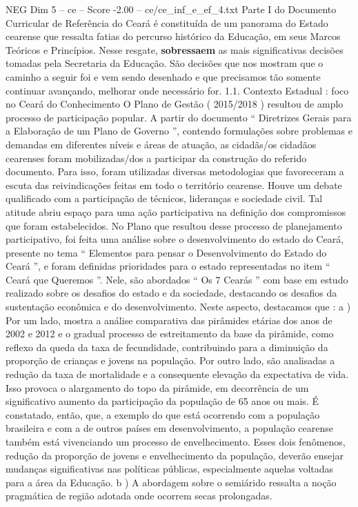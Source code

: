 \begin{textsample}{NEG Dim 5 – ce – Score -2.00 – ce/ce\_inf\_e\_ef\_4.txt}  \label{ex:f5_neg_036}
Parte I do Documento Curricular de Referência do Ceará é constituída de um panorama do Estado cearense que ressalta fatias do percurso histórico da Educação, em seus Marcos Teóricos e Princípios.
Nesse resgate, \textbf{sobressaem} as mais significativas decisões tomadas pela Secretaria da Educação.
São decisões que nos mostram que o caminho a seguir foi e vem sendo desenhado e que precisamos tão somente continuar avançando, melhorar onde necessário for. 1.1.
Contexto Estadual : foco no Ceará do Conhecimento O Plano de Gestão ( 2015/2018 ) resultou de amplo processo de participação popular.
A partir do documento “ Diretrizes Gerais para a Elaboração de um Plano de Governo ”, contendo formulações sobre problemas e demandas em diferentes níveis e áreas de atuação, as cidadãs/os cidadãos cearenses foram mobilizadas/dos a participar da construção do referido documento.
Para isso, foram utilizadas diversas metodologias que favoreceram a escuta das reivindicações feitas em todo o território cearense.
Houve um debate qualificado com a participação de técnicos, lideranças e sociedade civil.
Tal atitude abriu espaço para uma ação participativa na definição dos compromissos que foram estabelecidos.
No Plano que resultou desse processo de planejamento participativo, foi feita uma análise sobre o desenvolvimento do estado do Ceará, presente no tema “ Elementos para pensar o Desenvolvimento do Estado do Ceará ”, e foram definidas prioridades para o estado representadas no item “ Ceará que Queremos ”.
Nele, são abordados “ Os 7 Cearás ” com base em estudo realizado sobre os desafios do estado e da sociedade, destacando os desafios da sustentação econômica e do desenvolvimento.
Neste aspecto, destacamos que : a ) Por um lado, mostra a análise comparativa das pirâmides etárias dos anos de 2002 e 2012 e o gradual processo de estreitamento da base da pirâmide, como reflexo da queda da taxa de fecundidade, contribuindo para a diminuição da proporção de crianças e jovens na população.
Por outro lado, são analisadas a redução da taxa de mortalidade e a consequente elevação da expectativa de vida.
Isso provoca o alargamento do topo da pirâmide, em decorrência de um significativo aumento da participação da população de 65 anos ou mais.
É constatado, então, que, a exemplo do que está ocorrendo com a população brasileira e com a de outros países em desenvolvimento, a população cearense também está vivenciando um processo de envelhecimento.
Esses dois fenômenos, redução da proporção de jovens e envelhecimento da população, deverão ensejar mudanças significativas nas políticas públicas, especialmente aquelas voltadas para a área da Educação. b ) A abordagem sobre o semiárido ressalta a noção pragmática de região adotada onde ocorrem secas prolongadas.

\end{textsample}
